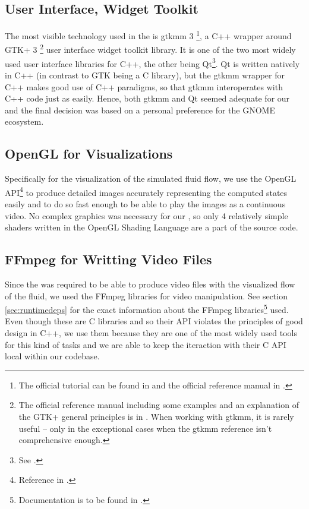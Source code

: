 \documentclass[11pt,a4paper,twoside,openright]{report}
\begin{document}
\subsection{User Interface, Widget Toolkit}
The most visible technology used in the \software{} is gtkmm 3 \footnote{The official tutorial can be found in \cite{gtkmm3} and the official reference manual in \cite{gtkmm3ref}.}, a C++ wrapper around GTK+ 3 \footnote{The official reference manual including some examples and an explanation of the GTK+ general principles is in \cite{gtk3ref}. When working with gtkmm, it is rarely useful -- only in the exceptional cases when the gtkmm reference isn't comprehensive enough.} user interface widget toolkit library. It is one of the two most widely used user interface libraries for C++, the other being Qt\footnote{See \cite{qt}.}. Qt is written natively in C++ (in contrast to GTK being a C library), but the gtkmm wrapper for C++ makes good use of C++ paradigms, so that gtkmm interoperates with C++ code just as easily. Hence, both gtkmm and Qt seemed adequate for our \software{} and the final decision was based on a personal preference for the GNOME ecosystem.

\subsection{OpenGL for Visualizations}
Specifically for the visualization of the simulated fluid flow, we use the OpenGL API\footnote{Reference in \cite{openglref}.} to produce detailed images accurately representing the computed states easily and to do so fast enough to be able to play the images as a continuous video. No complex graphics was necessary for our \software{}, so only 4 relatively simple shaders written in the OpenGL Shading Language are a part of the source code.

\subsection{FFmpeg for Writting Video Files}
Since the \software{} was required to be able to produce video files with the visualized flow of the fluid, we used the FFmpeg libraries for video manipulation. See section \ref{sec:runtimedeps} for the exact information about the FFmpeg libraries\footnote{Documentation is to be found in \cite{ffmpegdoc}.} used. Even though these are C libraries and so their API violates the principles of good design in C++, we use them because they are one of the most widely used tools for this kind of tasks and we are able to keep the iteraction with their C API local within our codebase.
\end{document}
